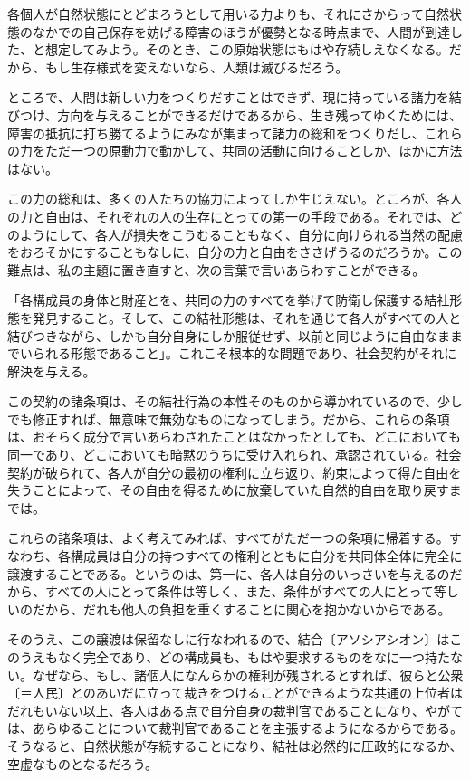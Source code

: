 各個人が自然状態にとどまろうとして用いる力よりも、それにさからって自然状態のなかでの自己保存を妨げる障害のほうが優勢となる時点まで、人間が到達した、と想定してみよう。そのとき、この原始状態はもはや存続しえなくなる。だから、もし生存様式を変えないなら、人類は滅びるだろう。

ところで、人間は新しい力をつくりだすことはできず、現に持っている諸力を結びつけ、方向を与えることができるだけであるから、生き残ってゆくためには、障害の抵抗に打ち勝てるようにみなが集まって諸力の総和をつくりだし、これらの力をただ一つの原動力で動かして、共同の活動に向けることしか、ほかに方法はない。

この力の総和は、多くの人たちの協力によってしか生じえない。ところが、各人の力と自由は、それぞれの人の生存にとっての第一の手段である。それでは、どのようにして、各人が損失をこうむることもなく、自分に向けられる当然の配慮をおろそかにすることもなしに、自分の力と自由をささげうるのだろうか。この難点は、私の主題に置き直すと、次の言葉で言いあらわすことができる。

「各構成員の身体と財産とを、共同の力のすべてを挙げて防衛し保護する結社形態を発見すること。そして、この結社形態は、それを通じて各人がすべての人と結びつきながら、しかも自分自身にしか服従せず、以前と同じように自由なままでいられる形態であること」。これこそ根本的な問題であり、社会契約がそれに解決を与える。

この契約の諸条項は、その結社行為の本性そのものから導かれているので、少しでも修正すれば、無意味で無効なものになってしまう。だから、これらの条項は、おそらく成分で言いあらわされたことはなかったとしても、どこにおいても同一であり、どこにおいても暗黙のうちに受け入れられ、承認されている。社会契約が破られて、各人が自分の最初の権利に立ち返り、約束によって得た自由を失うことによって、その自由を得るために放棄していた自然的自由を取り戻すまでは。

これらの諸条項は、よく考えてみれば、すべてがただ一つの条項に帰着する。すなわち、各構成員は自分の持つすべての権利とともに自分を共同体全体に完全に譲渡することである。というのは、第一に、各人は自分のいっさいを与えるのだから、すべての人にとって条件は等しく、また、条件がすべての人にとって等しいのだから、だれも他人の負担を重くすることに関心を抱かないからである。

そのうえ、この譲渡は保留なしに行なわれるので、結合〔アソシアシオン〕はこのうえもなく完全であり、どの構成員も、もはや要求するものをなに一つ持たない。なぜなら、もし、諸個人になんらかの権利が残されるとすれば、彼らと公衆〔＝人民〕とのあいだに立って裁きをつけることができるような共通の上位者はだれもいない以上、各人はある点で自分自身の裁判官であることになり、やがては、あらゆることについて裁判官であることを主張するようになるからである。そうなると、自然状態が存続することになり、結社は必然的に圧政的になるか、空虚なものとなるだろう。

